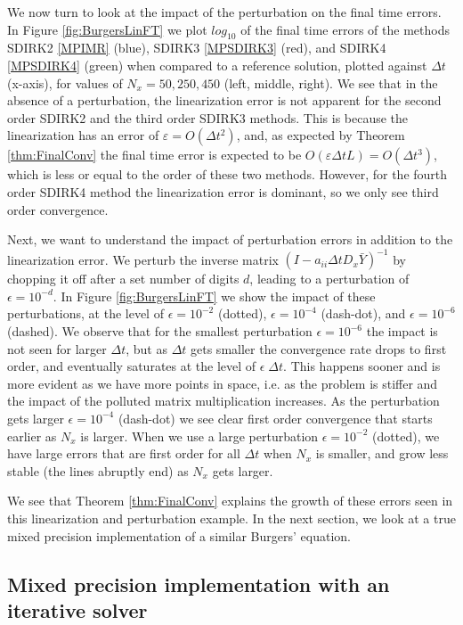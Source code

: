 \documentclass{siamart251104}
\newcommand{\dt}{\Delta t}
\begin{document}
We now turn to look at the impact of the perturbation 
on the final time errors.  In Figure \ref{fig:BurgersLinFT}
we plot $log_{10}$ of the final time errors of the methods SDIRK2
\eqref{MPIMR} (blue), SDIRK3 \eqref{MPSDIRK3} (red), and SDIRK4
\eqref{MPSDIRK4} (green) when compared to  a reference solution, 
plotted against  $\dt$ (x-axis),
for values of $N_x =50, 250, 450$ (left, middle, right). 
We see that in the absence of a perturbation, 
the linearization error is not apparent 
for the second order SDIRK2 and the third order SDIRK3 methods. This is because 
the linearization has an error of $\varepsilon = O(\dt^2)$,
and, as expected by Theorem \ref{thm:FinalConv} the final time error is expected to be 
$O(\varepsilon \dt L) = O(\dt^3) $, which is less or equal to the 
order of these two methods. However, for the fourth order SDIRK4 method
the linearization error is dominant, so we only see third order convergence.


Next, we want to understand the impact of perturbation errors in addition to the 
linearization error. We perturb the inverse matrix  $(I - a_{ii} \dt D_x \bar{Y})^{-1}$
by chopping it off after a set number of digits $d$, 
leading to  a perturbation of $\epsilon = 10^{-d}$.
In Figure \ref{fig:BurgersLinFT} we show the impact of these perturbations,
at the level of 
$\epsilon = 10^{-2}$ (dotted),
$\epsilon = 10^{-4}$ (dash-dot),
and $\epsilon = 10^{-6}$ (dashed).
We observe that for the smallest perturbation $\epsilon = 10^{-6}$
the impact is not seen for larger $\dt$, but as $\dt$ gets smaller
the convergence rate drops to first order, and eventually 
saturates at the level of $\epsilon \; \dt$.
This happens sooner and is more evident as we have more points in space, i.e. as the 
problem is stiffer and the impact of the polluted matrix multiplication increases.
As the perturbation gets larger $\epsilon = 10^{-4}$ (dash-dot)
we see clear first order convergence that starts earlier as $N_x$ is larger.
When we use a large perturbation $\epsilon = 10^{-2}$ (dotted), we have large errors that are first order for all $\dt$ when $N_x$ is smaller, and grow less stable 
(the lines abruptly end) as $N_x$ gets larger.

We see that Theorem \ref{thm:FinalConv} explains the growth of
these errors seen in this linearization and perturbation example.
In the next section, we look at a true mixed precision implementation of 
a similar Burgers' equation.



    
\subsection{Mixed precision implementation with an iterative solver}
\label{sec:BurgersMP}
\end{document}

